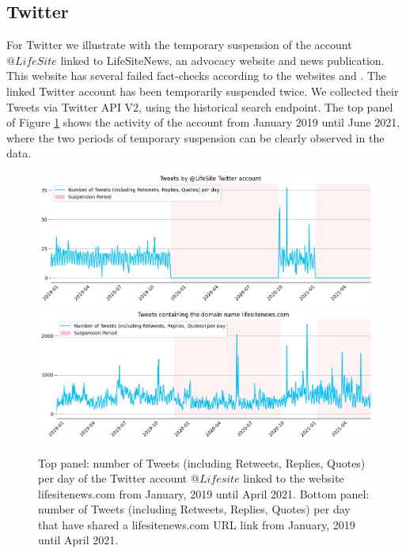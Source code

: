 \documentclass[Afour,sageh,times]{sagej}
\begin{document}
\subsection{Twitter}

For Twitter we illustrate with the temporary suspension of the account $@LifeSite$ linked to LifeSiteNews, an advocacy website and news publication. 
This website has several failed fact-checks according to the websites \cite{MBFClifesite} and \cite{openfeedbacklifesite}. 
The linked Twitter account has been temporarily suspended twice. 
We collected their Tweets via Twitter API V2, using the historical search endpoint. 
The top panel of Figure  \ref{fig2} shows the activity of the account from January 2019 until June 2021, where the two periods of temporary suspension can be clearly observed in the data.

\begin{figure}[h]
		\includegraphics[scale=0.32]{../figure/lifesite_updated_legend.jpg} 
		\includegraphics[scale=0.32]{../figure/lifesite_domain_updated_legend.jpg}
\caption{Top panel: number of Tweets (including Retweets, Replies, Quotes) per day of the Twitter account $@Lifesite$ linked to the website lifesitenews.com from January, 2019 until April 2021. Bottom panel: number of Tweets (including Retweets, Replies, Quotes) per day that have shared a lifesitenews.com URL link from January, 2019 until April 2021. }
\label{fig2}
\end{figure}
\end{document}
